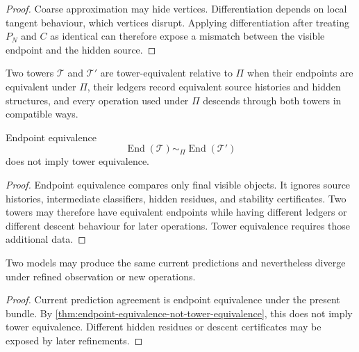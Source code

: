 \begin{proof}
Coarse approximation may hide vertices. Differentiation depends on local tangent behaviour, which vertices disrupt. Applying differentiation after treating $P_N$ and $C$ as identical can therefore expose a mismatch between the visible endpoint and the hidden source.
\end{proof}

\begin{definition}
\label{def:tower-equivalence}
Two towers $\mathcal T$ and $\mathcal T'$ are tower-equivalent relative to $\Pi$ when their endpoints are equivalent under $\Pi$, their ledgers record equivalent source histories and hidden structures, and every operation used under $\Pi$ descends through both towers in compatible ways.
\end{definition}

\begin{theorem}
\label{thm:endpoint-equivalence-not-tower-equivalence}
Endpoint equivalence
$$
\operatorname{End}(\mathcal T)
\sim_{\Pi}
\operatorname{End}(\mathcal T')
$$
does not imply tower equivalence.
\end{theorem}

\begin{proof}
Endpoint equivalence compares only final visible objects. It ignores source histories, intermediate classifiers, hidden residues, and stability certificates. Two towers may therefore have equivalent endpoints while having different ledgers or different descent behaviour for later operations. Tower equivalence requires those additional data.
\end{proof}

\begin{corollary}
\label{cor:agreement-now-diverge-later}
Two models may produce the same current predictions and nevertheless diverge under refined observation or new operations.
\end{corollary}

\begin{proof}
Current prediction agreement is endpoint equivalence under the present bundle. By \autoref{thm:endpoint-equivalence-not-tower-equivalence}, this does not imply tower equivalence. Different hidden residues or descent certificates may be exposed by later refinements.
\end{proof}

